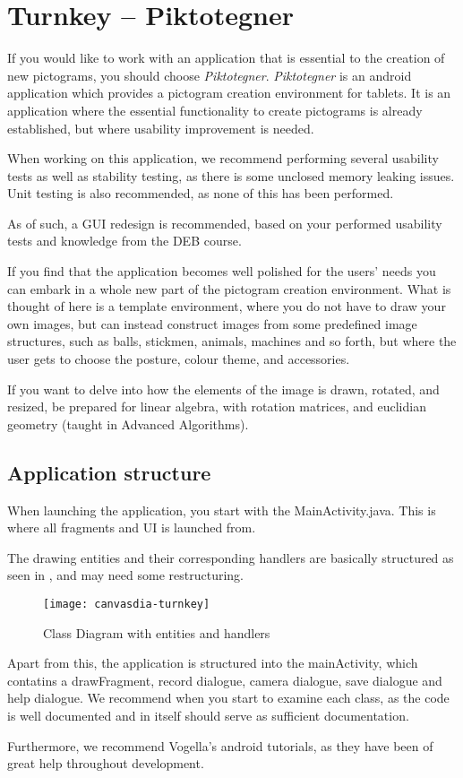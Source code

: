 \chapter{Turnkey -- Piktotegner}
If you would like to work with an application that is essential to the creation of new pictograms, you should choose \textit{Piktotegner}.
\textit{Piktotegner} is an android application which provides a pictogram creation environment for tablets.
It is an application where the essential functionality to create pictograms is already established, but where usability improvement is needed.

When working on this application, we recommend performing several usability tests as well as stability testing, as there is some unclosed memory leaking issues.
Unit testing is also recommended, as none of this has been performed.

As of such, a GUI redesign is recommended, based on your performed usability tests and knowledge from the DEB course.

If you find that the application becomes well polished for the users' needs you can embark in a whole new part of the pictogram creation environment.
What is thought of here is a template environment, where you do not have to draw your own images, but can instead construct images from some predefined image structures, such as balls, stickmen, animals, machines and so forth, but where the user gets to choose the posture, colour theme, and accessories.

If you want to delve into how the elements of the image is drawn, rotated, and resized, be prepared for linear algebra, with rotation matrices, and euclidian geometry (taught in Advanced Algorithms).

\section{Application structure}
When launching the application, you start with the MainActivity.java. 
This is where all fragments and UI is launched from.

The drawing entities and their corresponding handlers are basically structured as seen in , and may need some restructuring.

\begin{figure}[h]
     \centering
     \texttt{[image: canvasdia-turnkey]}
     \caption{Class Diagram with entities and handlers}
     \label{fig:turnkeydiacanvas}
\end{figure}

Apart from this, the application is structured into the mainActivity, which contatins a drawFragment, record dialogue, camera dialogue, save dialogue and help dialogue.
We recommend when you start to examine each class, as the code is well documented and in itself should serve as sufficient documentation.

Furthermore, we recommend Vogella's android tutorials, as they have been of great help throughout development.